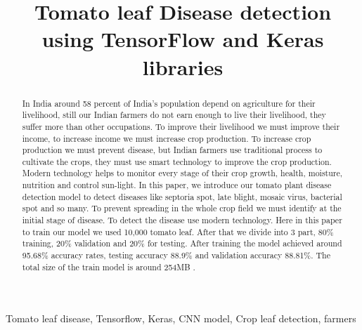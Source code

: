 \documentclass[conference]{IEEEtran}
\begin{document}
\title{Tomato leaf Disease detection using TensorFlow and  Keras libraries}

\author{
\and
{}
}

\maketitle

\begin{abstract}
In India around 58 percent of India's population depend on agriculture for their livelihood, still our Indian farmers do not earn enough to live their livelihood, they suffer more than other occupations. To improve their livelihood we must improve their income, to increase income we must increase crop production. To increase crop production we must prevent disease, but Indian farmers use traditional process to cultivate the crops, they must use smart technology to improve the crop production. Modern technology helps to monitor every stage of their crop growth, health, moisture, nutrition and control sun-light. In this paper, we introduce our tomato plant disease detection model to detect diseases like septoria spot, late blight, mosaic virus, bacterial spot and so many. To prevent spreading in the whole crop field we must identify at the initial stage of disease. To detect the disease use modern technology. Here in this paper to train our model we used 10,000 tomato leaf. After that we divide into 3 part, 80\% training, 20\% validation and 20\% for testing. After training the model achieved around 95.68\% accuracy rates, testing accuracy 88.9\% and validation accuracy 88.81\%. The total size of the train model is around 254MB .
\end{abstract}

\begin{IEEEkeywords}
Tomato leaf disease, Tensorflow, Keras, CNN model, Crop leaf detection, farmers
\end{IEEEkeywords}
\end{document}
